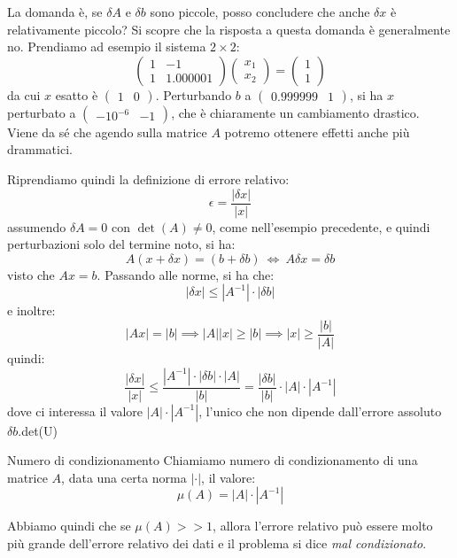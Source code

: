 \documentclass[a4paper,11pt]{article}
\begin{document}
La domanda è, se $\delta A$ e $\delta b$ sono piccole, posso concludere che anche $\delta x$ è relativamente piccolo?
Si scopre che la risposta a questa domanda è generalmente no.
Prendiamo ad esempio il sistema $2 \times 2$:
$$
\begin{pmatrix}
	1 & -1 \\
	1 & 1.000001
\end{pmatrix}
\begin{pmatrix}
	x_1 \\ x_2
\end{pmatrix}
=
\begin{pmatrix}
	1 \\ 1
\end{pmatrix}
$$
da cui $x$ esatto è $\begin{pmatrix}
	1 & 0
\end{pmatrix}$.
Perturbando $b$ a $\begin{pmatrix}
	0.999999 & 1
\end{pmatrix}$, si ha $x$ perturbato a $\begin{pmatrix}
	-10^{-6} & -1
\end{pmatrix}$, che è chiaramente un cambiamento drastico.
Viene da sé che agendo sulla matrice $A$ potremo ottenere effetti anche più drammatici.

Riprendiamo quindi la definizione di errore relativo:
$$
\epsilon = \frac{|\delta x|}{|x|}
$$
assumendo $\delta A = 0$ con $\det(A) \neq 0$, come nell'esempio precedente, e quindi perturbazioni solo del termine noto, si ha:
$$
A (x + \delta x) = (b + \delta b) \ \Leftrightarrow \ A\delta x = \delta b
$$
visto che $Ax = b$. Passando alle norme, si ha che:
$$
| \delta x | \leq |A^{-1}| \cdot |\delta b|
$$
e inoltre:
$$
|Ax| = |b| \implies |A| |x| \geq |b| \implies |x| \geq \frac{|b|}{|A|}
$$
quindi:
$$
\frac{|\delta x|}{|x|} \leq \frac{|A^{-1}| \cdot |\delta b| \cdot |A|}{|b|} = \frac{|\delta b|}{|b|} \cdot |A| \cdot |A^{-1}|
$$
dove ci interessa il valore $|A| \cdot |A^{-1}|$, l'unico che non dipende dall'errore assoluto $\delta b$.det(U)
\begin{definition}{Numero di condizionamento}
	Chiamiamo numero di condizionamento di una matrice $A$, data una certa norma $|\cdot|$, il valore:
	$$
		\mu(A) = |A| \cdot |A^{-1}|
	$$
\end{definition}

Abbiamo quindi che se $\mu(A) >> 1$, allora l'errore relativo può essere molto più grande dell'errore relativo dei dati e il problema si dice \textit{mal condizionato}.
\end{document}
